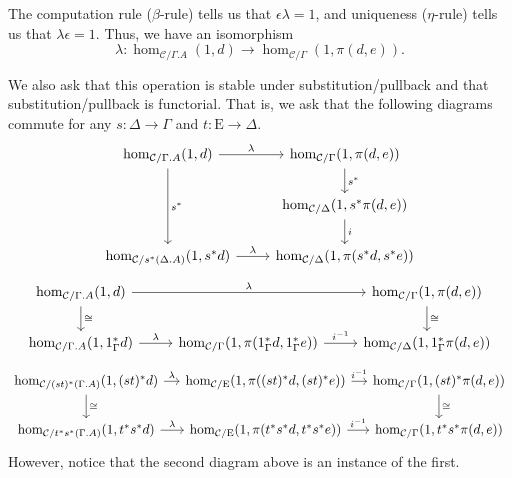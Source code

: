 \documentclass{article}
\theoremstyle{definition}
\newcommand{\C}{\mathcal C}
\newcommand{\Epsilon}{\mathrm E}
\begin{document}
The computation rule ($\beta$-rule) tells us that $\epsilon \lambda = 1$, and uniqueness ($\eta$-rule) tells us that $\lambda \epsilon = 1$. Thus, we have an isomorphism 
\[ \lambda : \hom_{\C / \Gamma . A} (1, d) \to \hom_{\C / \Gamma} (1 , {\pi(d,e)}).\]

We also ask that this operation is stable under substitution/pullback and that substitution/pullback is functorial. That is, we ask that the following diagrams commute for any $s : \Delta \to \Gamma$ and $t: \Epsilon \to \Delta$.
\[
     \begin{tikzcd}
        \hom_{\C / \Gamma . A} (1, d)  \ar[dd,"s^*"] \ar[r, "\lambda"] & \hom_{\C / \Gamma} (1 , {\pi(d,e)}) \ar[d,"s^*"]
         \\
         & \hom_{\C / \Delta} (1 , s^* {\pi(d,e)})
         \ar[d,"i"]
         \\
         \hom_{\C / s^*(\Delta . A)} (1, s^* d) \ar[r,"\lambda"] & \hom_{\C / \Delta} (1 ,  {\pi(s^*d,s^*e)})
     \end{tikzcd}
\]
\[
     \begin{tikzcd}
        \hom_{\C / \Gamma . A} (1, d) \ar[d,"\cong"] \ar[rr, "\lambda"] &&  \hom_{\C / \Gamma} (1 , {\pi(d,e)}) \ar[d,"\cong"]
        \\
        \hom_{\C / \Gamma.A} (1, 1_{\Gamma}^* d) \ar[r,"\lambda"] & \hom_{\C / \Gamma} (1 , {\pi(1_\Gamma^* d,1_\Gamma^* e)}) \ar[r,"i^{-1}"] & \hom_{\C / \Delta} (1 ,  1_\Gamma^* {\pi(d,e)})
     \end{tikzcd}
\]
\[
     \begin{tikzcd}[column sep=small]
        \hom_{\C / (st)^*(\Gamma . A)} (1, (st)^*d) \ar[d,"\cong"] \ar[r, "\lambda"] &
        \hom_{\C / \Epsilon} (1 , {\pi((st)^*d,(st)^*e)})  \ar[r,"i^{-1}"]
        &  \hom_{\C / \Gamma} (1 , (st)^* \pi(d,e)) \ar[d,"\cong"]
        \\
        \hom_{\C / t^* s^* (\Gamma . A)} (1, t^* s^*d)  \ar[r, "\lambda"] &
        \hom_{\C / \Epsilon} (1 , {\pi(t^* s^*d,t^* s^*e)})  \ar[r,"i^{-1}"]
        &  \hom_{\C / \Gamma} (1 , t^* s^* \pi(d,e)) 
     \end{tikzcd}
\]
However, notice that the second diagram above is an instance of the first.
\end{document}
